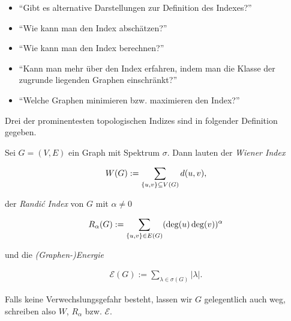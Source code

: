         \begin{itemize}
            \item \enquote{Gibt es alternative Darstellungen zur Definition des Indexes?}
            \item \enquote{Wie kann man den Index abschätzen?}
            \item \enquote{Wie kann man den Index berechnen?}
            \item \enquote{Kann man mehr über den Index erfahren, indem man die Klasse der zugrunde liegenden Graphen einschränkt?}
            \item \enquote{Welche Graphen minimieren bzw. maximieren den Index?}
        \end{itemize}

        Drei der prominentesten topologischen Indizes sind in folgender Definition gegeben.

        \begin{definition} \label{def:graph_indices}

            Sei $G = (V, E)$ ein Graph mit Spektrum $\sigma$.
            Dann lauten der \textit{Wiener Index}

            \begin{align*}
                W(G) := \sum_{{\left \{ u, v \right \}} \subseteq V(G)} d(u, v),
            \end{align*}

            der \textit{Randić Index} von $G$ mit $\alpha \neq 0$

            \begin{align*}
                R_\alpha(G)
                :=
                \sum_{{\left \{ u, v \right \}} \in E(G)} (\deg(u) \deg(v))^\alpha
            \end{align*}

            und die \textit{(Graphen-)Energie}

            \begin{align*}
                \mathcal E(G)
                :=
                \sum_{\lambda \in \sigma(G)} |\lambda|.
            \end{align*}

            Falls keine Verwechslungsgefahr besteht, lassen wir $G$ gelegentlich auch weg, schreiben also $W$, $R_\alpha$ bzw. $\mathcal E$.

        \end{definition}

